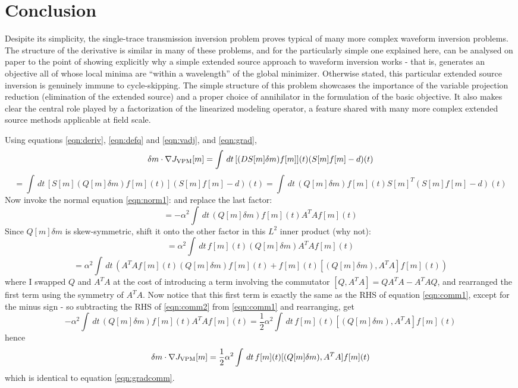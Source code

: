 \section{Conclusion}
Desipite its simplicity, the single-trace transmission inversion
problem proves typical of many more complex waveform inversion
problems. The structure of the derivative is similar in many of these
problems, and for the particularly simple one explained here, can be
analysed on paper to the point of showing explicitly why a simple
extended source approach to waveform inversion works - that is,
generates an objective all of whose local minima are ``within a
wavelength'' of the global minimizer. Otherwise stated, this
particular extended source inversion is genuinely immune to
cycle-skipping. The simple structure of this problem showcases the
importance of the variable projection reduction (elimination of the
extended source) and a proper choice of annihilator in the formulation
of the basic objective. It also makes clear the central role played by
a factorization of the linearized modeling operator, a feature shared
with many more complex extended source methods applicable at field scale.

Using equations \ref{eqn:deriv}, \ref{eqn:defq} and \ref{eqn:vadj},
and \ref{eqn:grad},
\[
\delta m \cdot \nabla J_{\rm VPM}[m] =  \int \,dt\,[(DS[m]\delta m)f[m]] (t) (S[m]f[m]-d)(t)
\]
\[
= \int \,dt\, [S[m](Q[m]\delta m)f[m](t)] (S[m]f[m]-d)(t) = \int
\,dt\,(Q[m]\delta m)f[m](t) S[m]^T(S[m]  f[m]-d)(t)
\]
Now invoke the normal equation \ref{eqn:norm1}: and replace the last factor:
\begin{equation}
\label{eqn:comm1}
= -\alpha^2\int \,dt\, (Q[m]\delta m)f[m](t)A^TAf[m](t)
\end{equation}
Since $Q[m]\delta m$ is skew-symmetric, shift it onto the other factor in this $L^2$ inner product (why not):
\[
= \alpha^2\int \,dt\, f[m](t)(Q[m]\delta m)A^TAf[m](t) 
\]
\begin{equation}
\label{eqn:comm2}
= \alpha^2\int \,dt\, (A^TAf[m](t)(Q[m]\delta m)f[m](t) + f[m](t)[(Q[m]\delta m),A^TA]f[m](t))
\end{equation}
where I swapped $Q$ and $A^TA$ at the cost of introducing a term involving the commutator $[Q,A^TA] = QA^TA-A^TAQ$, and rearranged the first term using the symmetry of $A^TA$. Now notice that this first term is exactly the same as the RHS of equation \ref{eqn:comm1}, except for the minus sign - so subtracting the RHS of \ref{eqn:comm2}
from \ref{eqn:comm1} and rearranging, get
\[
-\alpha^2\int \,dt\, (Q[m]\delta m)f[m](t)A^TAf[m](t) = \frac{1}{2}\alpha^2\int \,dt\,f[m](t)[(Q[m]\delta m),A^TA]f[m](t)
\]
hence 
\begin{equation}
\label{eqn:gradcomm-app}
\delta m \cdot \nabla J_{\rm VPM}[m] = \frac{1}{2}\alpha^2\int \,dt\,f[m](t)[(Q[m]\delta m),A^TA]f[m](t)
\end{equation}
which is identical to equation \ref{eqn:gradcomm}.





